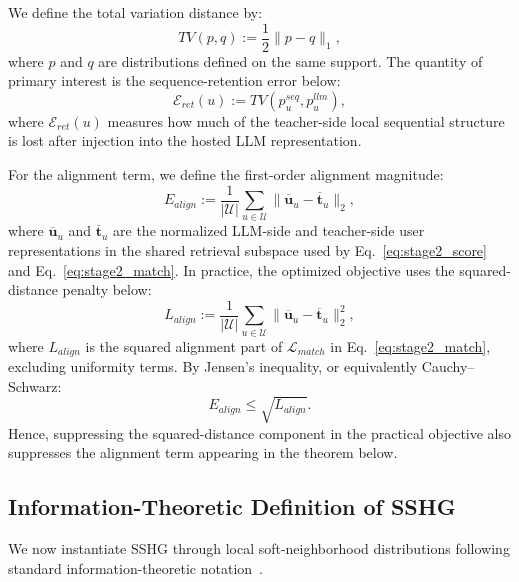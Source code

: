 ﻿\documentclass{article}
\begin{document}
We define the total variation distance by:
\begin{equation}
TV(p,q):=\frac{1}{2}\|p-q\|_1,
\label{eq:tv_def}
\end{equation}
where $p$ and $q$ are distributions defined on the same support.
The quantity of primary interest is the sequence-retention error below:
\begin{equation}
\mathcal{E}_{ret}(u):=TV(p_u^{seq},p_u^{llm}),
\label{eq:ret_error}
\end{equation}
where $\mathcal{E}_{ret}(u)$ measures how much of the teacher-side local sequential structure is lost after injection into the hosted LLM representation.

For the alignment term, we define the first-order alignment magnitude:
\begin{equation}
E_{align}:=\frac{1}{|\mathcal U|}\sum_{u\in\mathcal U}\|\overline{\mathbf{u}}_u-\overline{\mathbf{t}}_u\|_2,
\label{eq:e_align}
\end{equation}
where $\overline{\mathbf{u}}_u$ and $\overline{\mathbf{t}}_u$ are the normalized LLM-side and teacher-side user representations in the shared retrieval subspace used by Eq.~\eqref{eq:stage2_score} and Eq.~\eqref{eq:stage2_match}. In practice, the optimized objective uses the squared-distance penalty below:
\begin{equation}
L_{align}:=\frac{1}{|\mathcal U|}\sum_{u\in\mathcal U}\|\overline{\mathbf{u}}_u-\overline{\mathbf{t}}_u\|_2^2,
\label{eq:l_align}
\end{equation}
where $L_{align}$ is the squared alignment part of $\mathcal{L}_{match}$ in Eq.~\eqref{eq:stage2_match}, excluding uniformity terms. By Jensen's inequality, or equivalently Cauchy--Schwarz:
\begin{equation}
E_{align}\le \sqrt{L_{align}}.
\label{eq:e_vs_l_align}
\end{equation}
Hence, suppressing the squared-distance component in the practical objective also suppresses the alignment term appearing in the theorem below.

\subsection{Information-Theoretic Definition of SSHG}
\label{app:theory_sshg}

We now instantiate SSHG through local soft-neighborhood distributions following standard information-theoretic notation~\cite{cover2006elements}.
\end{document}
